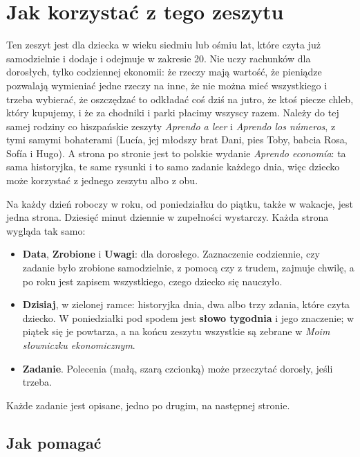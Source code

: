 \section*{Jak korzystać z tego zeszytu}

Ten zeszyt jest dla dziecka w wieku siedmiu lub ośmiu lat, które czyta
już samodzielnie i dodaje i odejmuje w zakresie 20. Nie uczy rachunków
dla dorosłych, tylko codziennej ekonomii: że rzeczy mają wartość, że
pieniądze pozwalają wymieniać jedne rzeczy na inne, że nie można mieć
wszystkiego i trzeba wybierać, że oszczędzać to odkładać coś dziś na
jutro, że ktoś piecze chleb, który kupujemy, i że za chodniki i parki
płacimy wszyscy razem. Należy do tej samej rodziny co hiszpańskie
zeszyty \emph{Aprendo a leer} i \emph{Aprendo los números}, z tymi
samymi bohaterami (Lucía, jej młodszy brat Dani, pies Toby, babcia Rosa,
Sofía i Hugo). A strona po stronie jest to polskie wydanie
\emph{Aprendo economía}: ta sama historyjka, te same rysunki i to samo
zadanie każdego dnia, więc dziecko może korzystać z jednego zeszytu albo
z obu.

Na każdy dzień roboczy w roku, od poniedziałku do piątku, także w
wakacje, jest jedna strona. Dziesięć minut dziennie w zupełności
wystarczy. Każda strona wygląda tak samo:

\begin{itemize}[leftmargin=6mm]
\item \textbf{Data}, \textbf{Zrobione} i \textbf{Uwagi}: dla dorosłego.
  Zaznaczenie codziennie, czy zadanie było zrobione samodzielnie, z
  pomocą czy z trudem, zajmuje chwilę, a po roku jest zapisem
  wszystkiego, czego dziecko się nauczyło.
\item \textbf{Dzisiaj}, w zielonej ramce: historyjka dnia, dwa albo trzy
  zdania, które czyta dziecko. W poniedziałki pod spodem jest
  \textbf{słowo tygodnia} i jego znaczenie; w piątek się je powtarza, a
  na końcu zeszytu wszystkie są zebrane w \emph{Moim słowniczku
  ekonomicznym}.
\item \textbf{Zadanie}. Polecenia (małą, szarą czcionką) może przeczytać
  dorosły, jeśli trzeba.
\end{itemize}

Każde zadanie jest opisane, jedno po drugim, na następnej stronie.

\subsection*{Jak pomagać}

